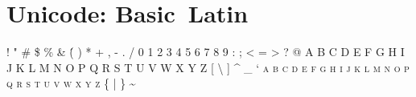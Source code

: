 

\presection\section*{\checkyes Unicode: Basic~Latin}\postsection

\textsc{! " \# \$ \% \& \' ( ) * + , - . / 0 1 2 3 4 5 6 7 8 9 : ; < = > ? @ 
A B C D E F G H I J K L M N O P Q R S T U V W X Y Z [ \textbackslash{} ] \^{} \_ ` 
a b c d e f g h i j k l m n o p q r s t u v w x y z \{ | \} \textasciitilde}